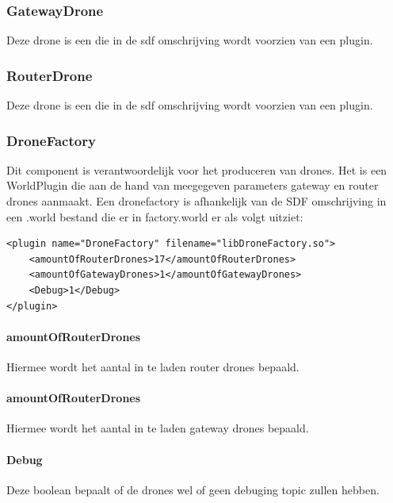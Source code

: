 \documentclass[a4paper, 11pt, oneside]{report}
\begin{document}
\subsubsection{GatewayDrone}
\label{architectural:subcomponenten:GatewayDrone}
Deze drone is een  die in de sdf omschrijving wordt voorzien van een  plugin. 
\subsubsection{RouterDrone}
\label{architectural:subcomponenten:RouterDrone}
Deze drone is een  die in de sdf omschrijving wordt voorzien van een  plugin. 

\subsubsection{DroneFactory}
\label{architectural:subcomponenten:DroneFactory}
Dit component is verantwoordelijk voor het produceren van drones. Het is een WorldPlugin die aan de hand van meegegeven parameters gateway en router drones aanmaakt. Een dronefactory is afhankelijk van de SDF omschrijving in een .world bestand die er in factory.world er als volgt uitziet:

\begin{lstlisting}
<plugin name="DroneFactory" filename="libDroneFactory.so">
	<amountOfRouterDrones>17</amountOfRouterDrones>
	<amountOfGatewayDrones>1</amountOfGatewayDrones>
	<Debug>1</Debug>
</plugin>
\end{lstlisting}

\paragraph{amountOfRouterDrones} Hiermee wordt het aantal in te laden router drones bepaald.
 
\paragraph{amountOfRouterDrones} Hiermee wordt het aantal in te laden gateway drones bepaald.

\paragraph{Debug} Deze boolean bepaalt of de drones wel of geen debuging topic zullen hebben.
\end{document}
